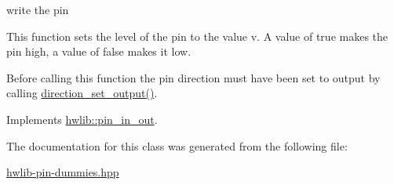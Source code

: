 write the pin 

This function sets the level of the pin to the value v. A value of true makes the pin high, a value of false makes it low.

Before calling this function the pin direction must have been set to output by calling \hyperlink{classhwlib_1_1__pin__in__out__dummy__class_a551f4d543e9fccd85ad843cbd9258a94}{direction\+\_\+set\+\_\+output()}. 

Implements \hyperlink{classhwlib_1_1pin__in__out_a198c4d27a9783f4c17e8f5dfd9aca6a9}{hwlib\+::pin\+\_\+in\+\_\+out}.



The documentation for this class was generated from the following file\+:\begin{DoxyCompactItemize}
\item 
\hyperlink{hwlib-pin-dummies_8hpp}{hwlib-\/pin-\/dummies.\+hpp}\end{DoxyCompactItemize}
